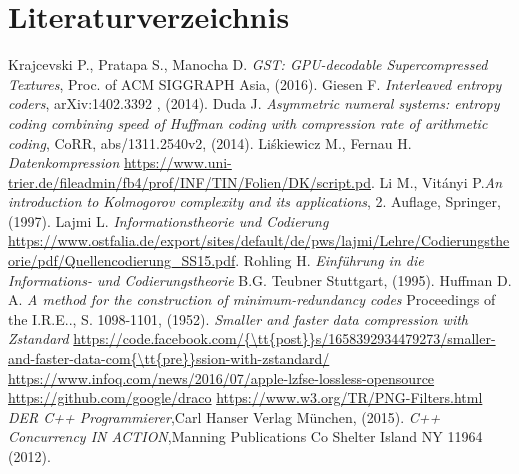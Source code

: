 \documentclass[a4paper,12pt]{article}
\begin{document}
\section{Literaturverzeichnis}
\thispagestyle{plain}
\begin{thebibliography}{DiplRS}
 Krajcevski P., Pratapa S., Manocha D. {\it GST: GPU-decodable Supercompressed Textures},  Proc. of ACM SIGGRAPH Asia, (2016).
  Giesen F. {\it Interleaved entropy coders},  arXiv:1402.3392 , (2014).
  Duda J. {\it Asymmetric numeral systems: entropy coding combining speed of Huffman coding with compression rate of arithmetic coding},  CoRR, abs/1311.2540v2, (2014).
 Li\'{s}kiewicz M., Fernau H. {\it Datenkompression} 
\url{ https://www.uni-trier.de/fileadmin/fb4/prof/INF/TIN/Folien/DK/script.pd}.
  Li M.,  Vit\'{a}nyi P.{\it An introduction to Kolmogorov complexity and its applications}, 2. Auflage, Springer, (1997).
 Lajmi L. {\it Informationstheorie und Codierung}
\url{https://www.ostfalia.de/export/sites/default/de/pws/lajmi/Lehre/Codierungstheorie/pdf/Quellencodierung_SS15.pdf}.
 Rohling H. {\it Einführung in die Informations- und Codierungstheorie} B.G. Teubner Stuttgart, (1995).
 Huffman D. A. {\it A method for the construction of minimum-redundancy codes} Proceedings of the I.R.E.., S. 1098-1101, (1952).
 {\it Smaller and faster data compression with Zstandard} \url{https://code.facebook.com/{\tt{post}}s/1658392934479273/smaller-and-faster-data-com{\tt{pre}}ssion-with-zstandard/}
 \url{https://www.infoq.com/news/2016/07/apple-lzfse-lossless-opensource}
 \url{https://github.com/google/draco}
 \url{https://www.w3.org/TR/PNG-Filters.html}
 {\it DER C++ Programmierer},Carl Hanser Verlag München, (2015).
 {\it C++ Concurrency IN ACTION},Manning Publications Co Shelter Island NY 11964 (2012).
\end{thebibliography}
\end{document}
